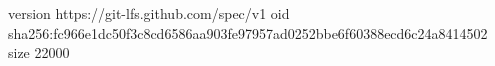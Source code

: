 version https://git-lfs.github.com/spec/v1
oid sha256:fc966e1dc50f3c8cd6586aa903fe97957ad0252bbe6f60388ecd6c24a8414502
size 22000

